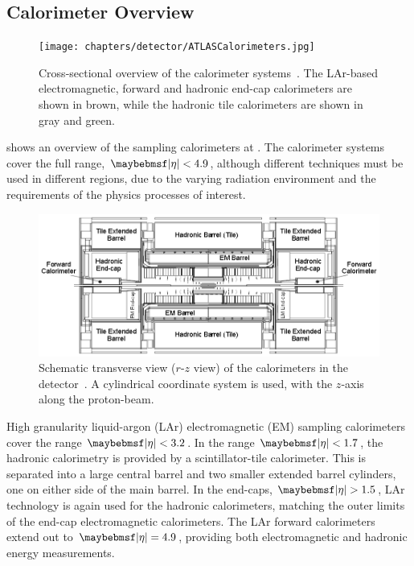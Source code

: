 \subsection{Calorimeter Overview}
\label{sec:detector:calorimeter_systems}
\begin{figure}[htpb]
  \texttt{[image: chapters/detector/ATLASCalorimeters.jpg]}
  \caption{Cross-sectional overview of the \ATLAS calorimeter systems~\cite{ATLAS:2008:detector}. The LAr-based electromagnetic, forward and hadronic end-cap calorimeters are shown in brown, while the hadronic tile calorimeters are shown in gray and green.}
  \label{fig:detector:atlas_calorimeters}
\end{figure}

 shows an overview of the sampling calorimeters at \ATLAS.
The calorimeter systems cover the full range, $\absEta<4.9$, although different techniques must be used in different \pseudorap regions, due to the varying radiation environment and the requirements of the physics processes of interest. 

\begin{figure}[htpb]
  \includegraphics[width=\largefigwidth]{chapters/detector/ATLASCalorimetersFlat.eps}
  \caption{Schematic transverse view ($r$-$z$ view) of the calorimeters in the \ATLAS detector~\cite{ATLAS:2008:detector}. A cylindrical coordinate system is used, with the $z$-axis along the proton-beam.}
  \label{fig:detector:atlas_calorimeters_flat}
\end{figure}

High granularity liquid-argon (LAr) electromagnetic (EM) sampling calorimeters cover the range $\absEta < 3.2$.
In the range $\absEta < 1.7$, the hadronic calorimetry is provided by a scintillator-tile calorimeter.
This is separated into a large central barrel and two smaller extended barrel cylinders, one on either side of the main barrel.
In the end-caps, $\absEta > 1.5$, LAr technology is again used for the hadronic calorimeters, matching the outer \absEta limits of the end-cap electromagnetic calorimeters.
The LAr forward calorimeters extend out to $\absEta = 4.9$, providing both electromagnetic and hadronic energy measurements.

